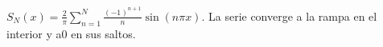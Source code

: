 $\displaystyle S_N(x)=\frac2\pi\sum_{n=1}^N\frac{(-1)^{n+1}}n\sin(n\pi x)$. La serie converge a la rampa en el interior y a0 en sus saltos.
